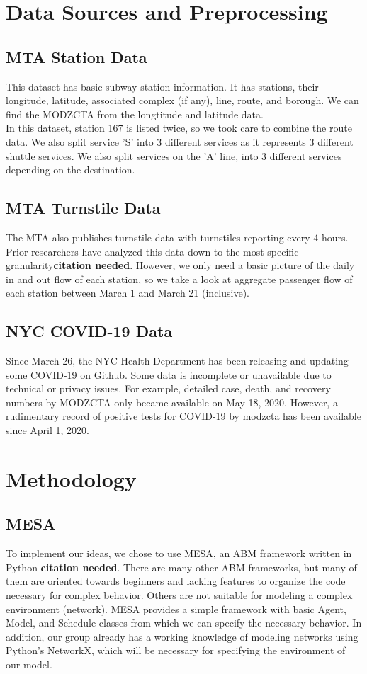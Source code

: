\documentclass[12pt, a4, epsf] {article}
\theoremstyle{plain}
\theoremstyle{definition}
\begin{document}
\section{Data Sources and Preprocessing}
\subsection{MTA Station Data}
This dataset has basic subway station information. It has stations, their longitude, latitude, associated complex (if any), line, route, and borough. We can find the MODZCTA from the longtitude and latitude data.\\
In this dataset, station 167 is listed twice, so we took care to combine the route data. We also split service 'S' into 3 different services as it represents 3 different shuttle services. We also split services on the 'A' line, into 3 different services depending on the destination. 
\subsection{MTA Turnstile Data}
The MTA also publishes turnstile data with turnstiles reporting every 4 hours. Prior researchers have analyzed this data down to the most specific granularity\textbf{citation needed}. However, we only need a basic picture of the daily in and out flow of each station, so we take a look at aggregate passenger flow of each station between March 1 and March 21 (inclusive). 
\subsection{NYC COVID-19 Data}
Since March 26, the NYC Health Department has been releasing and updating some COVID-19 on Github. Some data is incomplete or unavailable due to technical or privacy issues. For example, detailed case, death, and recovery numbers by MODZCTA only became available on May 18, 2020. However, a rudimentary record of positive tests for COVID-19 by modzcta has been available since April 1, 2020.
\section{Methodology}
\subsection{MESA}
To implement our ideas, we chose to use MESA, an ABM framework written in Python \textbf{citation needed}. There are many other ABM frameworks, but many of them are oriented towards beginners and lacking features to organize the code necessary for complex behavior. Others are not suitable for modeling a complex environment (network). MESA provides a simple framework with basic Agent, Model, and Schedule classes from which we can specify the necessary behavior. In addition, our group already has a working knowledge of modeling networks using Python's NetworkX, which will be necessary for specifying the environment of our model.
\end{document}
